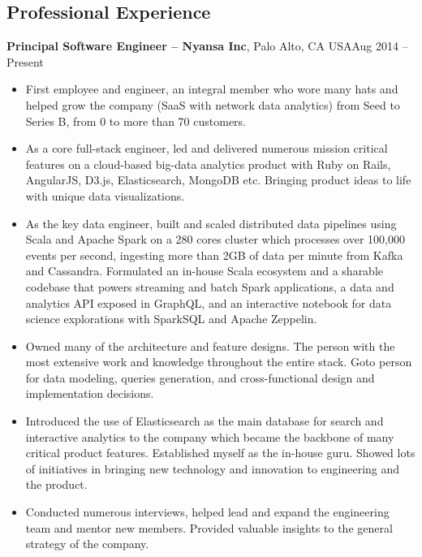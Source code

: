 \documentclass[margin,line]{res}
\newcommand{\sstyle}{\sc}
\begin{document}
\begin{resume}
  \section{\sstyle Professional Experience}
  {\bf Principal Software Engineer -- Nyansa Inc}, Palo Alto, CA USA\hfill Aug 2014 -- Present
  \vspace{.05in}
  \begin{itemize}
  \item First employee and engineer, an integral member who wore many hats and
        helped grow the company (SaaS with network data analytics) from Seed to
        Series B, from 0 to more than 70 customers.
  \item As a core full-stack engineer, led and delivered numerous mission
        critical features on a cloud-based big-data analytics product with
        Ruby on Rails, AngularJS, D3.js, Elasticsearch, MongoDB etc. Bringing
        product ideas to life with unique data visualizations.
  \item As the key data engineer, built and scaled distributed data pipelines
        using Scala and Apache Spark on a 280 cores cluster which processes over
        100,000 events per second, ingesting more than 2GB of data per minute
        from Kafka and Cassandra. Formulated an in-house Scala ecosystem and a
        sharable codebase that powers streaming and batch Spark applications,
        a data and analytics API exposed in GraphQL, and an interactive notebook
        for data science explorations with SparkSQL and Apache Zeppelin.
  \item Owned many of the architecture and feature designs. The person with the
        most extensive work and knowledge throughout the entire stack. Goto
        person for data modeling, queries generation, and cross-functional
        design and implementation decisions.
  \item Introduced the use of Elasticsearch as the main database for search and
        interactive analytics to the company which became the backbone of many
        critical product features. Established myself as the in-house guru.
        Showed lots of initiatives in bringing new technology and innovation to
        engineering and the product.
  \item Conducted numerous interviews, helped lead and expand the engineering
        team and mentor new members. Provided valuable insights to the general
        strategy of the company.
  \end{itemize}


\end{resume}
\end{document}
